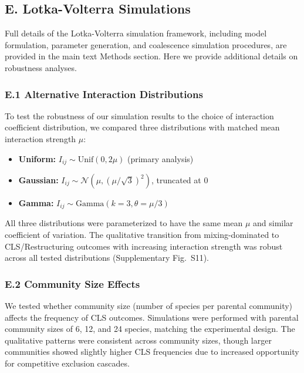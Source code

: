 \subsection*{E. Lotka-Volterra Simulations}
\label{sec:suppl:simulations}

Full details of the Lotka-Volterra simulation framework, including model formulation, parameter generation, and coalescence simulation procedures, are provided in the main text Methods section. Here we provide additional details on robustness analyses.

\subsubsection*{E.1 Alternative Interaction Distributions}

To test the robustness of our simulation results to the choice of interaction coefficient distribution, we compared three distributions with matched mean interaction strength $\mu$:

\begin{itemize}
    \item \textbf{Uniform:} $I_{ij} \sim \text{Unif}(0, 2\mu)$ (primary analysis)
    \item \textbf{Gaussian:} $I_{ij} \sim \mathcal{N}(\mu, (\mu/\sqrt{3})^2)$, truncated at 0
    \item \textbf{Gamma:} $I_{ij} \sim \text{Gamma}(k=3, \theta=\mu/3)$
\end{itemize}

All three distributions were parameterized to have the same mean $\mu$ and similar coefficient of variation. The qualitative transition from mixing-dominated to CLS/Restructuring outcomes with increasing interaction strength was robust across all tested distributions (Supplementary Fig.~S11).

\subsubsection*{E.2 Community Size Effects}

We tested whether community size (number of species per parental community) affects the frequency of CLS outcomes. Simulations were performed with parental community sizes of 6, 12, and 24 species, matching the experimental design. The qualitative patterns were consistent across community sizes, though larger communities showed slightly higher CLS frequencies due to increased opportunity for competitive exclusion cascades.

